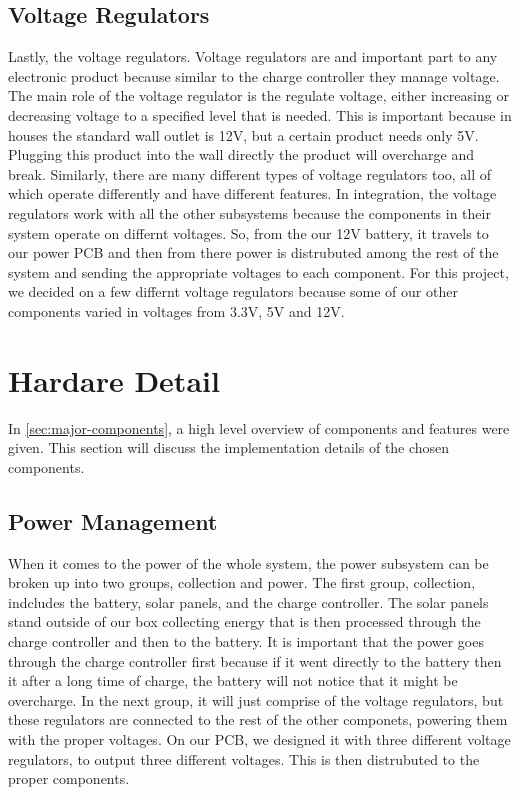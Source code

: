 \documentclass[journal]{IEEEtran}
\begin{document}
\subsection{Voltage Regulators} \label{sec:voltage regulator}
Lastly, the voltage regulators. Voltage regulators are and important part to any electronic product because 
similar to the charge controller they manage voltage. The main role of the voltage regulator is the regulate 
voltage, either increasing or decreasing voltage to a specified level that is needed. This is important 
because in houses the standard wall outlet is 12V, but a certain product needs only 5V. Plugging this product 
into the wall directly the product will overcharge and break. Similarly, there are many different types of 
voltage regulators too, all of which operate differently and have different features. In integration, the 
voltage regulators work with all the other subsystems because the components in their system operate on 
differnt voltages. So, from the our 12V battery, it travels to our power PCB and then from there power is 
distrubuted among the rest of the system and sending the appropriate voltages to each component. For this 
project, we decided on a few differnt voltage regulators because some of our other components varied in 
voltages from 3.3V, 5V and 12V. 

\section{Hardare Detail}
In \autoref{sec:major-components}, a high level overview of components and features were given. This
section will discuss the implementation details of the chosen components.
\subsection{Power Management} \label{sec:power management}
When it comes to the power of the whole system, the power subsystem can be broken up into two groups, collection 
and power. The first group, collection, indcludes the battery, solar panels, and the charge controller. 
The solar panels stand outside of our box collecting energy that is then processed through the charge 
controller and then to the battery. It is important that the power goes through the charge controller first 
because if it went directly to the battery then it after a long time of charge, the battery will not notice 
that it might be overcharge. In the next group, it will just comprise of the voltage regulators, but these 
regulators are connected to the rest of the other componets, powering them with the proper voltages. On our 
PCB, we designed it with three different voltage regulators, to output three different voltages. This is then 
distrubuted to the proper components.
\end{document}
